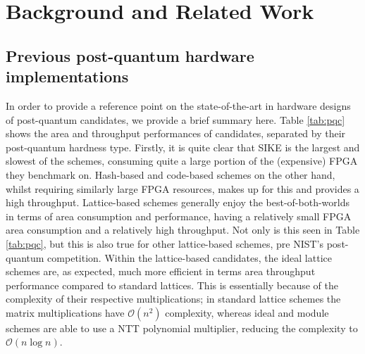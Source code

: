 \vspace{-0.2cm}
\section{Background and Related Work} \label{sec:related}
  

\subsection{Previous post-quantum hardware implementations}

In order to provide a reference point on the state-of-the-art in hardware designs of post-quantum candidates, we provide a brief summary here. Table \ref{tab:pqc} shows the area and throughput performances of candidates, separated by their post-quantum hardness type. Firstly, it is quite clear that SIKE is the largest and slowest of the schemes, consuming quite a large portion of the (expensive) FPGA they benchmark on. Hash-based and code-based schemes on the other hand, whilst requiring similarly large FPGA resources, makes up for this and provides a high throughput. Lattice-based schemes generally enjoy the best-of-both-worlds in terms of area consumption and performance, having a relatively small FPGA area consumption and a relatively high throughput. Not only is this seen in Table \ref{tab:pqc}, but this is also true for other lattice-based schemes, pre NIST's post-quantum competition. Within the lattice-based candidates, the ideal lattice schemes are, as expected, much more efficient in terms area throughput performance compared to standard lattices. This is essentially because of the complexity of their respective multiplications; in standard lattice schemes the matrix multiplications have $ \mathcal{O}(n^2)$ complexity, whereas ideal and module schemes are able to use a NTT polynomial multiplier, reducing the complexity to $ \mathcal{O}(n\log n)$.

